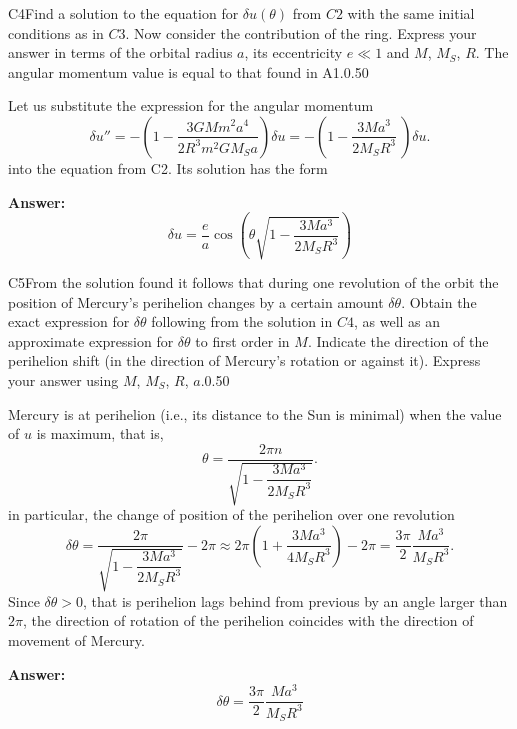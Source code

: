 \documentclass[11pt,a4paper]{article}
\begin{document}
\begin{solcard}{C4}{Find a solution to the equation for $\delta u(\theta)$ from $C2$ with the same initial conditions as in $C3$. Now consider the contribution of the ring. Express your answer in terms of the orbital radius $a$, its eccentricity $e\ll 1$ and $M$, $M_S$, $R$. The angular momentum value is equal to that found in A1.}{0.50}

Let us substitute the expression for the angular momentum $$ \delta u'' = - \left(1 -\frac{3 G M m^2 a^4}{2 R^3 m^2 G M_S a}  \right) \delta u = - \left(1 -\frac{3  M a^3 }{2 M_S R^3 } \ \right) \delta u. $$ into the equation from C2. Its solution has the form

\par\smallskip\noindent\textbf{Answer:} $$ \delta u = \frac{e}{a} \cos \left( \theta\sqrt{1 - \frac{3  M a^3 }{2 M_S R^3 } }\right) $$
\end{solcard}

\begin{solcard}{C5}{From the solution found it follows that during one revolution of the orbit the position of Mercury’s perihelion changes by a certain amount $\delta \theta$. Obtain the exact expression for $\delta  \theta$ following from the solution in $C4$, as well as an approximate expression for $\delta  \theta$ to first order in $M$. Indicate the direction of the perihelion shift (in the direction of Mercury's rotation or against it). Express your answer using $M$, $M_S$, $R$, $a$.}{0.50}

Mercury is at perihelion (i.e., its distance to the Sun is minimal) when the value of $u$ is maximum, that is, $$ \theta = \frac{2\pi n}{\sqrt{1 - \dfrac{3  M a^3 }{2 M_S R^3 }} }. $$in particular, the change of position of the perihelion over one revolution $$ \delta \theta  = \frac{2\pi }{\sqrt{1 - \dfrac{3  M a^3 }{2 M_S R^3 }} } - 2\pi \approx 2\pi \left( 1 + \dfrac{3  M a^3 }{4 M_S R^3 }\right) - 2\pi = \frac{3 \pi }{2} \frac{M a^3}{M_S R^3}. $$Since $\delta \theta > 0$, that is perihelion lags behind from previous by an angle larger than $2\pi$, the direction of rotation of the perihelion coincides with the direction of movement of Mercury.

\par\smallskip\noindent\textbf{Answer:} $$ \delta \theta  = \frac{3 \pi }{2} \frac{M a^3}{M_S R^3} $$
\end{solcard}
\end{document}
